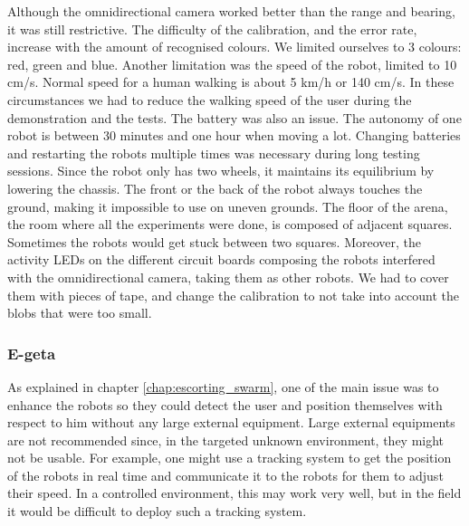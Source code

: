 \documentclass[oneside, a4paper, 12pt]{memoir}
\begin{document}
		Although the omnidirectional camera worked better than the range and bearing, it was still restrictive. The difficulty of the calibration, and the error rate, increase with the amount of recognised colours. We limited ourselves to 3 colours: red, green and blue. Another limitation was the speed of the robot, limited to 10 cm/s. Normal speed for a human walking is about 5 km/h or 140 cm/s. In these circumstances we had to reduce the walking speed of the user during the demonstration and the tests. The battery was also an issue. The autonomy of one robot is between 30 minutes and one hour when moving a lot. Changing batteries and restarting the robots multiple times was necessary during long testing sessions. Since the robot only has two wheels, it maintains its equilibrium by lowering the chassis. The front or the back of the robot always touches the ground, making it impossible to use on uneven grounds. The floor of the arena, the room where all the experiments were done, is composed of adjacent squares. Sometimes the robots would get stuck between two squares. Moreover, the activity LEDs on the different circuit boards composing the robots interfered with the omnidirectional camera, taking them as other robots. We had to cover them with pieces of tape, and change the calibration to not take into account the blobs that were too small.
		
		\subsubsection{E-geta} %

		
	As explained in chapter \ref{chap:escorting_swarm}, one of the main issue was to enhance the robots so they could detect the user and position themselves with respect to him without any large external equipment. Large external equipments are not recommended since, in the targeted unknown environment, they might not be usable. For example, one might use a tracking system to get the position of the robots in real time and communicate it to the robots for them to adjust their speed. In a controlled environment, this may work very well, but in the field it would be difficult to deploy such a tracking system.
	
\end{document}
